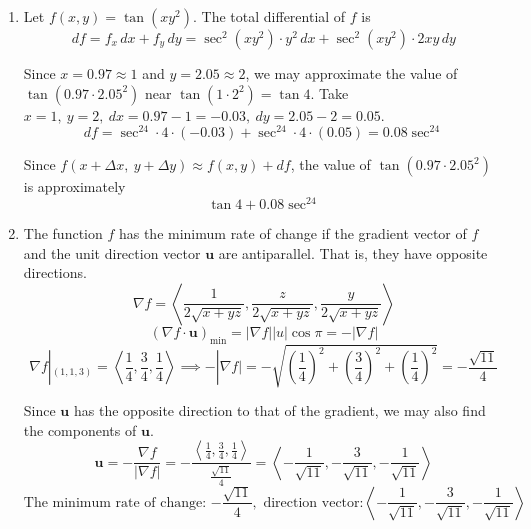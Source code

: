 \documentclass[a4paper, 12pt]{article}
\begin{document}
\begin{enumerate}[leftmargin=*,label=\textbf{\arabic*.}]
\begin{align*}\frac{\partial w}{\partial s}=&\left[y\ln\left(1+\sqrt{x^2+y^2}\right)+xy\cdot\frac1{1+\sqrt{x^2+y^2}}\cdot\left(\frac{x}{\sqrt{x^2+y^2}}\right)+z\right]\cdot1\\[1em]&+\left[x\ln\left(1+\sqrt{x^2+y^2}\right)+xy\cdot\frac1{1+\sqrt{x^2+y^2}}\cdot\left(\frac{y}{\sqrt{x^2+y^2}}\right)\right]\cdot{e}^s+\frac{2xs}{s^2+t}\end{align*}

Write in terms of $s$ and $t$ rigorously.
\[\boxed{\begin{array}{ll}\dfrac{\partial w}{\partial s}=&
{e}^s\ln\left(1+\sqrt{(t+s)^2+{e}^{2s}}\right)+\dfrac{(t+s)^2\cdot{e}^s}{\sqrt{(t+s)^2+{e}^{2s}}+(t+s)^2+{e}^{2s}}+\ln\left(s^2+t\right)\\[1em]&+(t+s){e}^s\ln\left(1+\sqrt{(t+s)^2+{e}^{2s}}\right)+\dfrac{(t+s)\cdot{e}^{3s}}{\sqrt{(t+s)^2+{e}^{2s}}+(t+s)^2+{e}^{2s}}\\[1em]&+\dfrac{2s(t+s)}{s^2+t}
\end{array}}\]

\item Let $f(x,y)=\tan\left(xy^2\right)$. The total differential of $f$ is
\[df=f_x\,dx+f_y\,dy=\sec^2\left(xy^2\right)\cdot y^2\,dx+\sec^2\left(xy^2\right)\cdot2xy\,dy\]

Since $x=0.97\approx1$ and $y=2.05\approx2$, we may approximate the value of \linebreak $\tan\left(0.97\cdot2.05^2\right)$ near $\tan\left(1\cdot 2^2\right)=\tan4$. Take $x=1,\:y=2,\:dx=0.97-1=-0.03,\:dy=2.05-2=0.05$.
\[df=\sec^24\cdot4\cdot(-0.03)+\sec^24\cdot4\cdot(0.05)=0.08\sec^24\]

Since $f(x+\Delta x,\:y+\Delta y)\approx f(x,y)+df$, the value of $\tan\left(0.97\cdot2.05^2\right)$ is approximately
\[\boxed{\tan4+0.08\sec^24}\]

\item The function $f$ has the minimum rate of change if the gradient vector of $f$ and the unit direction vector $\mathbf u$ are antiparallel. That is, they have opposite directions.
\[\nabla f=\left\langle\frac1{2\sqrt{x+yz}},\frac z{2\sqrt{x+yz}},\frac y{2\sqrt{x+yz}}\right\rangle\]
\[\left(\nabla f\cdot \mathbf u\right)_{\text{min}}=\left|\nabla f\right||u|\cos\pi=-|\nabla f|\]
\[\nabla f|_{(1,1,3)}=\left\langle\frac14,\frac34,\frac14\right\rangle\implies-|\nabla f|=-\sqrt{\left(\frac14\right)^2+\left(\frac34\right)^2+\left(\frac14\right)^2}=-\frac{\sqrt{11}}4\]

Since $\mathbf u$ has the opposite direction to that of the gradient, we may also find the components of $\mathbf u$.
\[\mathbf{u}=-\frac{\nabla f}{|\nabla f|}=-\frac{\left\langle\frac14,\frac34,\frac14\right\rangle}{\frac{\sqrt{11}}4}=\left\langle-\frac1{\sqrt{11}},-\frac3{\sqrt{11}},-\frac1{\sqrt{11}}\right\rangle\]
\[\boxed{\text{The minimum rate of change: }{-\frac{\sqrt{11}}4},\text{ direction vector:}\left\langle-\frac1{\sqrt{11}},-\frac3{\sqrt{11}},-\frac1{\sqrt{11}}\right\rangle}\]


\end{enumerate}
\end{document}
